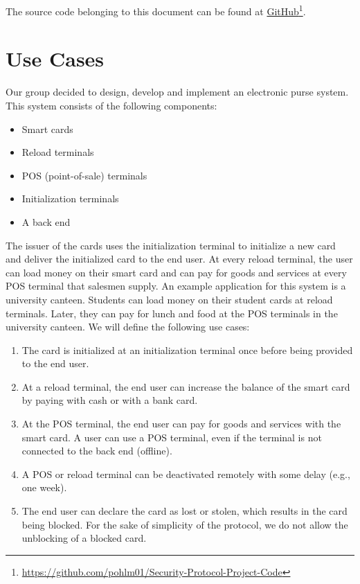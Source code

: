 \documentclass{article}
\begin{document}
\maketitle


The source code belonging to this document can be found at \href{https://github.com/pohlm01/Security-Protocol-Project-Code}{GitHub}\footnote{\url{https://github.com/pohlm01/Security-Protocol-Project-Code}}.

\section{Use Cases}
Our group decided to design, develop and implement an electronic purse system.
This system consists of the following components:
\begin{itemize}
    \item Smart cards
    \item Reload terminals
    \item POS (point-of-sale) terminals
    \item Initialization terminals
    \item A back end
\end{itemize}
The issuer of the cards uses the initialization terminal to initialize a new card and deliver the initialized card to the end user.
At every reload terminal, the user can load money on their smart card and can pay for goods and services at every POS terminal that salesmen supply.
An example application for this system is a university canteen.
Students can load money on their student cards at reload terminals.
Later, they can pay for lunch and food at the POS terminals in the university canteen.
We will define the following use cases:
\begin{enumerate}[label={UC\arabic*:}, ref={UC\arabic*}, leftmargin=3\parindent]
    \item \label{uc:person} The card is initialized at an initialization terminal once before being provided to the end user.
    
    \item \label{uc:reload} At a reload terminal, the end user can increase the balance of the smart card by paying with cash or with a bank card.
    
    \item \label{uc:payment} At the POS terminal, the end user can pay for goods and services with the smart card.
    A user can use a POS terminal, even if the terminal is not connected to the back end (offline).

    \item A POS or reload terminal can be deactivated remotely with some delay (e.g., one week).
    
    \item The end user can declare the card as lost or stolen, which results in the card being blocked.
    For the sake of simplicity of the protocol, we do not allow the unblocking of a blocked card.
    
\end{enumerate}
\end{document}
